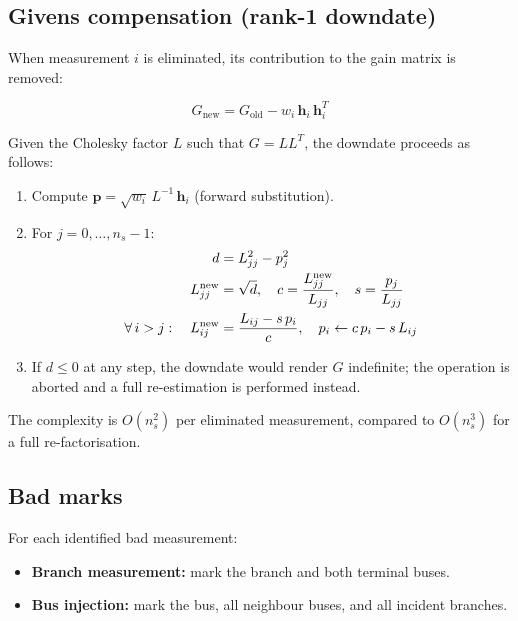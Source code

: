 \documentclass[11pt,a4paper]{article}
\begin{document}
\subsection{Givens compensation (rank-1 downdate)}\label{sec:givens}

When measurement $i$ is eliminated, its contribution to the gain matrix
is removed:

\begin{equation}
  G_\text{new} = G_\text{old} - w_i\,\mathbf{h}_i\,\mathbf{h}_i^T
\end{equation}

Given the Cholesky factor $L$ such that $G = LL^T$, the downdate
proceeds as follows:

\begin{enumerate}
  \item Compute $\mathbf{p} = \sqrt{w_i}\,L^{-1}\,\mathbf{h}_i$
        (forward substitution).
  \item For $j = 0, \ldots, n_s{-}1$:
    \begin{align}
      d &= L_{jj}^2 - p_j^2 \notag \\
      L_{jj}^\text{new} &= \sqrt{d}, \quad
      c = \frac{L_{jj}^\text{new}}{L_{jj}}, \quad
      s = \frac{p_j}{L_{jj}} \notag \\
      \forall\,i > j: \quad
      L_{ij}^\text{new} &= \frac{L_{ij} - s\,p_i}{c}, \quad
      p_i \leftarrow c\,p_i - s\,L_{ij}
    \end{align}
  \item If $d \le 0$ at any step, the downdate would render $G$
        indefinite; the operation is aborted and a full re-estimation
        is performed instead.
\end{enumerate}

\noindent
The complexity is $O(n_s^2)$ per eliminated measurement, compared to
$O(n_s^3)$ for a full re-factorisation.

\subsection{Bad marks}\label{sec:bdd-marks}

For each identified bad measurement:
\begin{itemize}
  \item \textbf{Branch measurement:} mark the branch and both terminal
        buses.
  \item \textbf{Bus injection:} mark the bus, all neighbour buses, and
        all incident branches.
\end{itemize}
\end{document}
